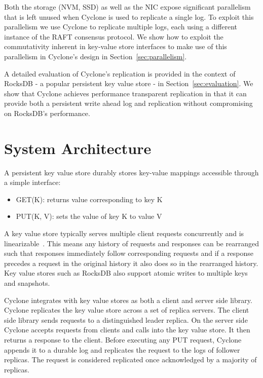 \documentclass[pageno]{jpaper}
\begin{document}
Both the storage (NVM, SSD) as well as the NIC expose significant parallelism
that is left unused when Cyclone is used to replicate a single log. To exploit
this parallelism we use Cyclone to replicate multiple logs, each using a
different instance of the RAFT consensus protocol. We show how to exploit the
commutativity inherent in key-value store interfaces to make use of this
parallelism in Cyclone's design in Section~\ref{sec:parallelism}.

A detailed evaluation of Cyclone's replication is provided in the context of
RocksDB - a popular persistent key value store - in
Section~\ref{sec:evaluation}. We show that Cyclone achieves performance
transparent replication in that it can provide both a persistent write ahead log
and replication without compromising on RocksDB's performance.

\section{System Architecture}
\label{sec:sysarch}
A persistent key value store durably stores key-value mappings accessible through a
simple interface:

\begin{itemize}
\item GET(K): returns value corresponding to key K
\item PUT(K, V): sets the value of key K to value V
\end{itemize}

A key value store typically serves multiple client requests concurrently and is
linearizable~\cite{linearizability}. This means any history of requests and
responses can be rearranged such that responses immediately follow corresponding
requests and if a response precedes a request in the original history it also
does so in the rearranged history. Key value stores such as RocksDB also
support atomic writes to multiple keys and snapshots. 

Cyclone integrates with key value stores as both a client and server side
library. Cyclone replicates the key value store across a set of replica
servers. The client side library sends requests to a distinguished leader
replica.  On the server side Cyclone accepts requests from clients and calls
into the key value store. It then returns a response to the client. Before
executing any PUT request, Cyclone appends it to a durable log and replicates
the request to the logs of follower replicas. The request is considered
replicated once acknowledged by a majority of replicas.
\end{document}
